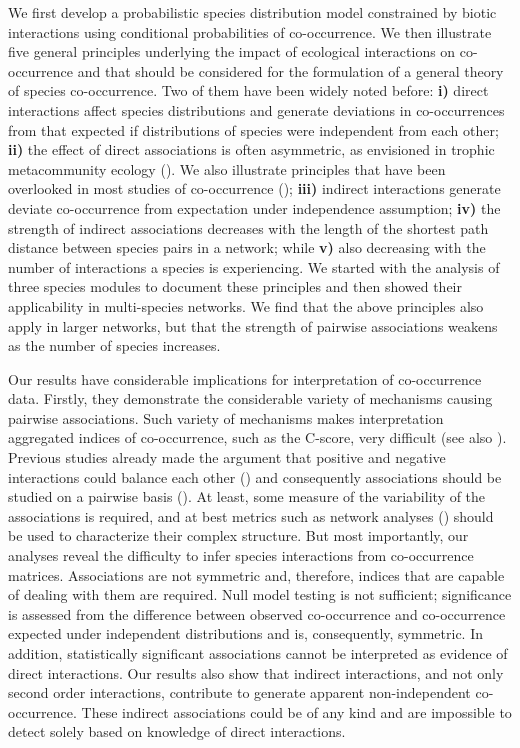 %
We first develop a probabilistic species distribution model constrained by
biotic interactions using conditional probabilities of co-occurrence. We then illustrate five general principles underlying the impact of ecological interactions on co-occurrence and that should be considered for the formulation of a general theory of species co-occurrence. Two of them have been widely noted before: \textbf{i)} direct interactions affect species distributions and generate deviations in co-occurrences from that expected if distributions of species were independent from each other; \textbf{ii)} the effect of direct associations is often asymmetric, as envisioned in trophic metacommunity ecology (\citealt{Holt2009Trophic}). We also illustrate principles that have been overlooked in most studies of co-occurrence (\citealt{Araujo2011Using}); \textbf{iii)} indirect interactions generate deviate co-occurrence from expectation under independence assumption; \textbf{iv)} the strength of indirect associations decreases with the length of the shortest path distance between species pairs in a network; while \textbf{v)} also decreasing with the number of interactions a species is experiencing. We started with the analysis of three species modules to document these principles and then showed their applicability in multi-species networks. We find that the above principles also apply in larger networks, but that the strength of pairwise associations weakens as the number of species increases.

Our results have considerable implications for interpretation of co-occurrence data. Firstly, they demonstrate the considerable variety of mechanisms causing pairwise associations. Such variety of mechanisms makes interpretation aggregated indices of co-occurrence, such as the C-score, very difficult (see also \citealt{Araujo2014Geographic}). Previous studies already made
the argument that positive and negative interactions could balance each other
(\citealt{Boulangeat2012Accounting}) and consequently associations should be
studied on a pairwise basis (\citealt{Veech2013Probabilistic}). At least, some
measure of the variability of the associations is required, and at best
metrics such as network analyses (\citealt{Araujo2011Using}) should be used to
characterize their complex structure. But most importantly, our analyses
reveal the difficulty to infer species interactions from co-occurrence
matrices. Associations are not symmetric and, therefore, indices that are capable of dealing with them are required. Null model testing is not sufficient; significance is assessed from the difference between observed co-occurrence and co-occurrence expected under independent distributions and is, consequently, symmetric. In addition, statistically significant associations cannot be interpreted as evidence of direct interactions. Our results also show that indirect interactions, and not only second order interactions, contribute to generate apparent non-independent co-occurrence. These indirect associations could be of any kind and are impossible to detect solely based on knowledge of direct interactions.

